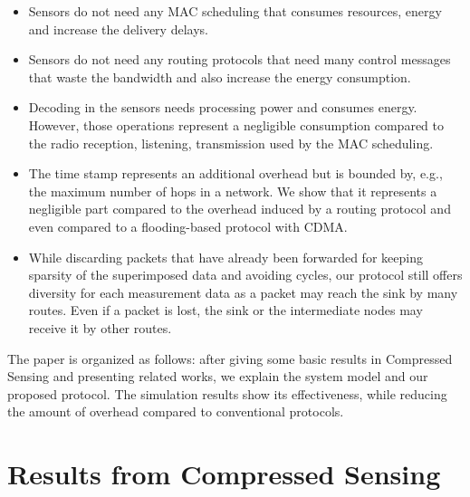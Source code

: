 \documentclass[letterpaper,conference]{IEEEtran}
\begin{document}
\begin{itemize}
\item Sensors do not need any MAC scheduling that consumes resources, energy and increase the delivery delays.
\item Sensors do not need any routing protocols that need many control messages that waste the bandwidth and also increase the energy consumption.
\item Decoding in the sensors needs processing power and consumes energy. However, those operations represent a negligible consumption compared to the radio reception, listening, transmission used by the MAC scheduling.
\item The time stamp represents an additional overhead but is bounded by, e.g., the maximum number of hops in a network. We show that it represents a negligible part compared to the overhead induced by a routing protocol and even compared to a flooding-based protocol with CDMA.
\item While discarding packets that have already been forwarded for keeping sparsity of the superimposed data and avoiding cycles, our protocol still offers diversity for each measurement data as a packet may reach the sink by many routes. Even if a packet is lost, the sink or the intermediate nodes may receive it by other routes.
\end{itemize}

The paper is organized as follows: after giving some basic results in Compressed Sensing and presenting related works, we explain the system model and our proposed protocol. The simulation results show its effectiveness, while reducing the amount of overhead compared to conventional protocols.


\section{Results from Compressed Sensing}
\label{sec CS}
\end{document}
